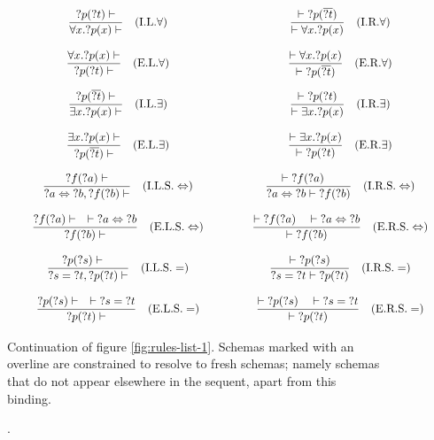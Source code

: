 \begin{figure}[hbt!]
  $$\arraycolsep=0.75cm\def\arraystretch{3}\begin{array}{c c}
  \dfrac{{?p}({?t}) \vdash}{\forall x. {?p}(x) \vdash} \quad (\text{I.L.} \forall) & \dfrac{\vdash {?p}(\overline{?t})}{\vdash \forall x. {?p}(x)} \quad (\text{I.R.} \forall) \\
  \dfrac{\forall x. {?p}(x) \vdash}{{?p}({?t}) \vdash} \quad (\text{E.L.} \forall) & \dfrac{\vdash \forall x. {?p}(x)}{\vdash {?p}(\overline{?t})} \quad (\text{E.R.} \forall) \\
  \dfrac{{?p}(\overline{?t}) \vdash}{\exists x. {?p}(x) \vdash} \quad (\text{I.L.} \exists) & \dfrac{\vdash {?p}({?t})}{\vdash \exists x. {?p}(x)} \quad (\text{I.R.} \exists) \\
  \dfrac{\exists x. {?p}(x) \vdash}{{?p}(\overline{?t}) \vdash} \quad (\text{E.L.} \exists) & \dfrac{\vdash \exists x. {?p}(x)}{\vdash {?p}({?t})} \quad (\text{E.R.} \exists) \\
  \dfrac{{?f}({?a}) \vdash}{{?a} \Leftrightarrow {?b}, {?f}({?b}) \vdash} \quad (\text{I.L.S.} \Leftrightarrow) & \dfrac{\vdash {?f}({?a}) \quad}{{?a} \Leftrightarrow {?b} \vdash {?f}({?b})} \quad (\text{I.R.S.} \Leftrightarrow) \\
  \dfrac{{?f}({?a}) \vdash \quad \vdash {?a} \Leftrightarrow {?b}}{{?f}({?b}) \vdash} \quad (\text{E.L.S.} \Leftrightarrow) & \dfrac{\vdash {?f}({?a}) \quad \vdash {?a} \Leftrightarrow {?b}}{\vdash {?f}({?b})} \quad (\text{E.R.S.} \Leftrightarrow) \\
  \dfrac{{?p}({?s}) \vdash \quad}{{?s} = {?t}, {?p}({?t}) \vdash} \quad (\text{I.L.S.} =) & \dfrac{\vdash {?p}({?s})}{{?s} = {?t} \vdash {?p}({?t})} \quad (\text{I.R.S.} =) \\
  \dfrac{{?p}({?s}) \vdash \quad \vdash {?s} = {?t}}{{?p}({?t}) \vdash} \quad (\text{E.L.S.} =) & \dfrac{\vdash {?p}({?s}) \quad \vdash {?s} = {?t}}{\vdash {?p}({?t})} \quad (\text{E.R.S.} =)
  \end{array}$$
  \caption[Rules, continued]{Continuation of figure \ref{fig:rules-list-1}. Schemas marked with an overline are constrained to resolve to fresh schemas; namely schemas that do not appear elsewhere in the sequent, apart from this binding.}
  \label{fig:rules-list-2}
\end{figure}

\begin{figure}[hbt!]
  \centering
  
  \caption[XXXX]{.}
  \label{fig:scala-proof-sample}
\end{figure}

